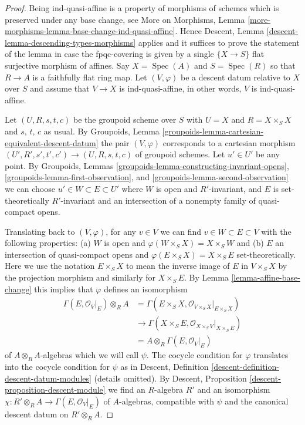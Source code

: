 \documentclass{stacks-project}
\theoremstyle{plain}
\theoremstyle{definition}
\theoremstyle{remark}
\numberwithin{equation}{subsection}
\def\Spec{\mathop{\mathrm{Spec}}}
\begin{document}
\begin{proof}
Being ind-quasi-affine is a property of morphisms of schemes
which is preserved under any base change, see
More on Morphisms, Lemma
\ref{more-morphisms-lemma-base-change-ind-quasi-affine}.
Hence Descent, Lemma \ref{descent-lemma-descending-types-morphisms} applies
and it suffices to prove the statement of the lemma
in case the fpqc-covering is given by a single
$\{X \to S\}$ flat surjective morphism of affines.
Say $X = \Spec(A)$ and $S = \Spec(R)$ so
that $R \to A$ is a faithfully flat ring map.
Let $(V, \varphi)$ be a descent datum relative to $X$ over $S$
and assume that $V \to X$ is ind-quasi-affine, in other words,
$V$ is ind-quasi-affine.

\medskip\noindent
Let $(U, R, s, t, c)$ be the groupoid scheme over $S$ with
$U = X$ and $R = X \times_S X$ and $s$, $t$, $c$ as usual.
By Groupoids, Lemma \ref{groupoids-lemma-cartesian-equivalent-descent-datum}
the pair $(V, \varphi)$ corresponds to a cartesian morphism
$(U', R', s', t', c') \to (U, R, s, t, c)$ of groupoid schemes.
Let $u' \in U'$ be any point. By
Groupoids, Lemmas \ref{groupoids-lemma-constructing-invariant-opens},
\ref{groupoids-lemma-first-observation}, and
\ref{groupoids-lemma-second-observation}
we can choose $u' \in W \subset E \subset U'$
where $W$ is open and $R'$-invariant, and
$E$ is set-theoretically $R'$-invariant and
an intersection of a nonempty family of quasi-compact opens.

\medskip\noindent
Translating back to $(V, \varphi)$, for any $v \in V$ we can find
$v \in W \subset E \subset V$ with the following properties:
(a) $W$ is open and $\varphi(W \times_S X) = X \times_S W$ and
(b) $E$ an intersection of quasi-compact opens and
$\varphi(E \times_S X) = X \times_S E$ set-theoretically.
Here we use the notation $E \times_S X$ to mean the
inverse image of $E$ in $V \times_S X$ by the projection morphism and
similarly for $X \times_S E$. By Lemma \ref{lemma-affine-base-change}
this implies that $\varphi$ defines an isomorphism
\begin{align*}
\Gamma(E, \mathcal{O}_V|_E) \otimes_R A
& =
\Gamma(E \times_S X, \mathcal{O}_{V \times_S X}|_{E \times_S X}) \\
& \to
\Gamma(X \times_S E, \mathcal{O}_{X \times_S V}|_{X \times_S E}) \\
& =
A \otimes_R \Gamma(E, \mathcal{O}_V|_E)
\end{align*}
of $A \otimes_R A$-algebras which we will call $\psi$.
The cocycle condition for $\varphi$
translates into the cocycle condition for $\psi$ as in
Descent, Definition \ref{descent-definition-descent-datum-modules}
(details omitted). By Descent, Proposition
\ref{descent-proposition-descent-module}
we find an $R$-algebra $R'$ and an isomorphism
$\chi : R' \otimes_R A \to \Gamma(E, \mathcal{O}_V|_E)$
of $A$-algebras, compatible with $\psi$ and the
canonical descent datum on $R' \otimes_R A$.


\end{proof}
\end{document}
